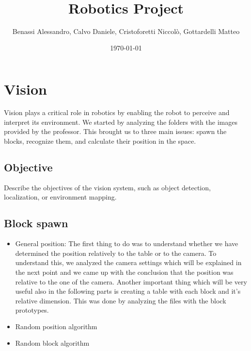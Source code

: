 \documentclass[12pt,a4paper]{article}
\title{Robotics Project}
\author{Benassi Alessandro, Calvo Daniele, Cristoforetti Niccolò, Gottardelli Matteo}
\date{\today}
\begin{document}
\maketitle
\tableofcontents
\newpage

\section{Vision}
Vision plays a critical role in robotics by enabling the robot to perceive and interpret its environment. 
We started by analyzing the folders with the images provided by the professor. This brought us to three main issues: spawn the blocks, recognize them, and calculate their position in the space. 

\subsection{Objective}
Describe the objectives of the vision system, such as object detection, localization, or environment mapping.

\subsection{Block spawn}

\begin{itemize}
    \item General position: The first thing to do was to understand whether we have determined the position relatively to the table or to the camera. To understand this, we analyzed the camera settings which will be explained in the next point and we came up with the conclusion that the position was relative to the one of the camera.
    Another important thing which will be very useful also in the following parts is creating a table with each block and it's relative dimension. This was done by analyzing the files with the block prototypes.
    \item Random position algorithm
    \item Random block algorithm
\end{itemize}
\end{document}

